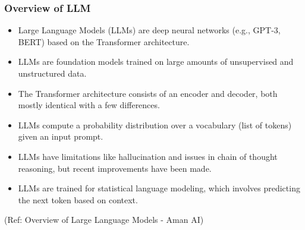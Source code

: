\begin{frame}[fragile]\frametitle{Overview of LLM}


\begin{itemize}
\item Large Language Models (LLMs) are deep neural networks (e.g., GPT-3, BERT) based on the Transformer architecture.
\item LLMs are foundation models trained on large amounts of unsupervised and unstructured data.
\item The Transformer architecture consists of an encoder and decoder, both mostly identical with a few differences.
\item LLMs compute a probability distribution over a vocabulary (list of tokens) given an input prompt.
\item LLMs have limitations like hallucination and issues in chain of thought reasoning, but recent improvements have been made.
\item LLMs are trained for statistical language modeling, which involves predicting the next token based on context.
\end{itemize}

				
{\tiny (Ref: Overview of Large Language Models - Aman AI)}

\end{frame}

  
    
    
    
    
